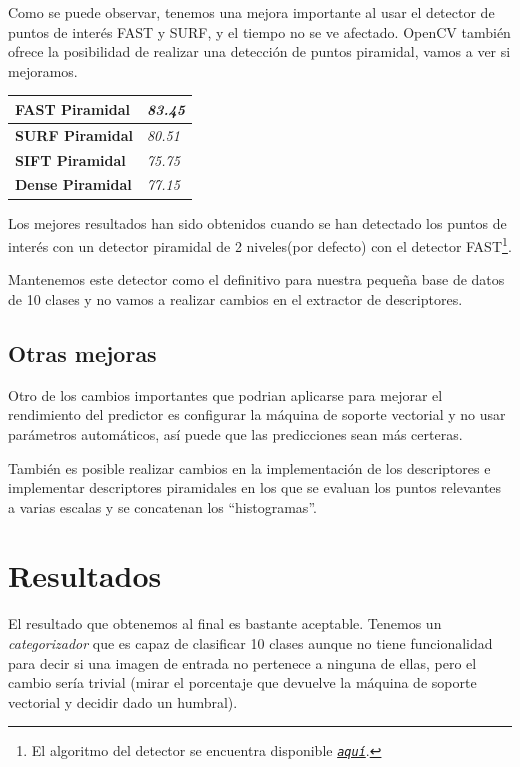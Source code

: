 \documentclass[a4paper,12pt]{article}
\begin{document}
Como se puede observar, tenemos una mejora importante al usar el detector de 
puntos de interés FAST y SURF, y el tiempo no se ve afectado. OpenCV también
ofrece la posibilidad de realizar una detección de puntos piramidal, vamos a
 ver si mejoramos.
\begin{table}[h]
\centering
\begin{tabular}{|l|l|}
\hline
\textbf{FAST Piramidal}  & \textit{83.45} \\ \hline
\textbf{SURF Piramidal}  & \textit{80.51} \\ \hline
\textbf{SIFT Piramidal}  & \textit{75.75} \\ \hline
\textbf{Dense Piramidal} & \textit{77.15} \\ \hline
\end{tabular}
\end{table}

Los mejores resultados han sido obtenidos cuando se han detectado los puntos de
interés con un detector piramidal de 2 niveles(por defecto) con el detector
FAST\footnote{El algoritmo del detector se encuentra disponible 
\href{http://docs.opencv.org/trunk/doc/py_tutorials/py_feature2d/py_fast/py_fast.html}
{\texttt{\emph{aquí}}}.}. 

Mantenemos este detector como el definitivo para 
nuestra pequeña base de datos de 10 clases y no vamos a realizar cambios en el 
extractor de descriptores.

\subsection{Otras mejoras}
Otro de los cambios importantes que podrian aplicarse para mejorar el 
rendimiento del predictor es configurar la máquina de soporte vectorial y no 
usar parámetros automáticos, así puede que las predicciones sean más certeras.

También es posible realizar cambios en la implementación de los descriptores e 
implementar descriptores piramidales en los que se evaluan los puntos relevantes
a varias escalas y se concatenan los ``histogramas''.

\section{Resultados}

El resultado que obtenemos al final es bastante aceptable. Tenemos un 
\emph{categorizador} que es capaz de clasificar 10 clases aunque no tiene 
funcionalidad para decir si una imagen de entrada no pertenece a ninguna de 
ellas, pero el cambio sería trivial (mirar el porcentaje que devuelve la 
máquina de soporte vectorial y decidir dado un humbral). 
\end{document}
